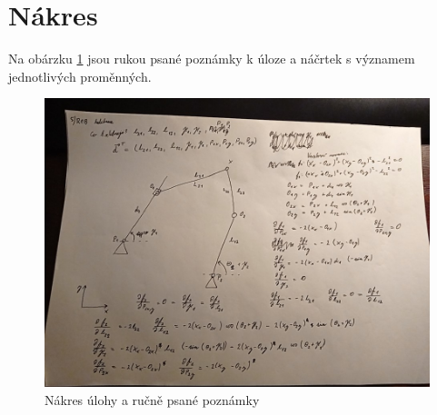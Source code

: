 \documentclass[twoside]{article}
\begin{document}
\section{Nákres}

Na obárzku \ref{fig:nakres} jsou rukou psané poznámky k úloze a náčrtek s významem jednotlivých proměnných.

\begin{figure}[htbp]
	\centering
	\includegraphics[width=\linewidth]{nakres.jpg}
	\caption{Nákres úlohy a ručně psané poznámky}
	\label{fig:nakres}	
\end{figure}
\end{document}
